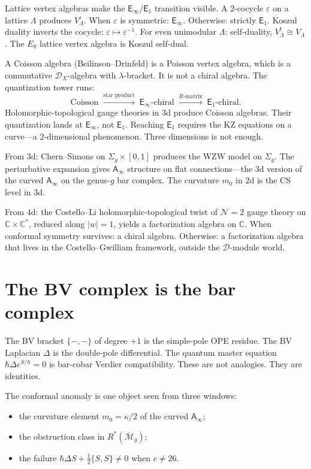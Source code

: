 \documentclass[11pt]{article}
\newcommand{\cM}{\mathcal{M}}
\newcommand{\cN}{\mathcal{N}}
\newcommand{\cD}{\mathcal{D}}
\newcommand{\C}{\mathbb{C}}
\newcommand{\Eone}{\mathsf{E}_1}
\newcommand{\Einf}{\mathsf{E}_{\infty}}
\newcommand{\Ainf}{\mathsf{A}_{\infty}}
\begin{document}
Lattice vertex algebras make the $\Einf$/$\Eone$ transition
visible.  A $2$-cocycle $\varepsilon$ on a lattice $\Lambda$
produces $V_\Lambda^\varepsilon$.  When $\varepsilon$ is symmetric:
$\Einf$.  Otherwise: strictly $\Eone$.  Koszul duality inverts the
cocycle: $\varepsilon \mapsto \varepsilon^{-1}$.  For even unimodular
$\Lambda$: self-duality, $V_\Lambda^! \cong V_\Lambda$.  The $E_8$
lattice vertex algebra is Koszul self-dual.

A Coisson algebra (Beilinson--Drinfeld) is a Poisson vertex algebra,
which is a commutative $\cD_X$-algebra with $\lambda$-bracket.  It
is not a chiral algebra.  The quantization tower runs:
\[
\text{Coisson}
\;\xrightarrow{\text{star product}}\;
\Einf\text{-chiral}
\;\xrightarrow{R\text{-matrix}}\;
\Eone\text{-chiral}.
\]
Holomorphic-topological gauge theories in $3$d produce Coisson
algebras.  Their quantization lands at $\Einf$, not $\Eone$.
Reaching $\Eone$ requires the KZ equations on a curve---a
$2$-dimensional phenomenon.  Three dimensions is not enough.

From $3$d: Chern--Simons on $\Sigma_g \times [0,1]$ produces the
WZW model on $\Sigma_g$.  The perturbative expansion gives $\Ainf$
structure on flat connections---the $3$d version of the curved
$\Ainf$ on the genus-$g$ bar complex.  The curvature $m_0$ in $2$d
is the CS level in $3$d.

From $4$d: the Costello--Li holomorphic-topological twist of
$\cN = 2$ gauge theory on $\C \times \C^*$, reduced along $|w|=1$,
yields a factorization algebra on $\C$.  When conformal symmetry
survives: a chiral algebra.  Otherwise: a factorization algebra
that lives in the Costello--Gwilliam framework, outside the
$\cD$-module world.


\section{The BV complex is the bar complex}
\label{sec:bv}

The BV bracket $\{-,-\}$ of degree $+1$ is the simple-pole OPE
residue.  The BV Laplacian $\Delta$ is the double-pole differential.
The quantum master equation $\hbar\Delta e^{S/\hbar} = 0$ is
bar-cobar Verdier compatibility.  These are not analogies.  They are identities.

The conformal anomaly is one object seen from three windows:
\begin{itemize}[nosep]
\item the curvature element $m_0 = \kappa/2$ of the curved $\Ainf$;
\item the obstruction class in $R^*(\overline{\cM}_g)$;
\item the failure $\hbar\Delta S + \tfrac{1}{2}\{S,S\} \neq 0$
  when $c \neq 26$.
\end{itemize}
\end{document}
